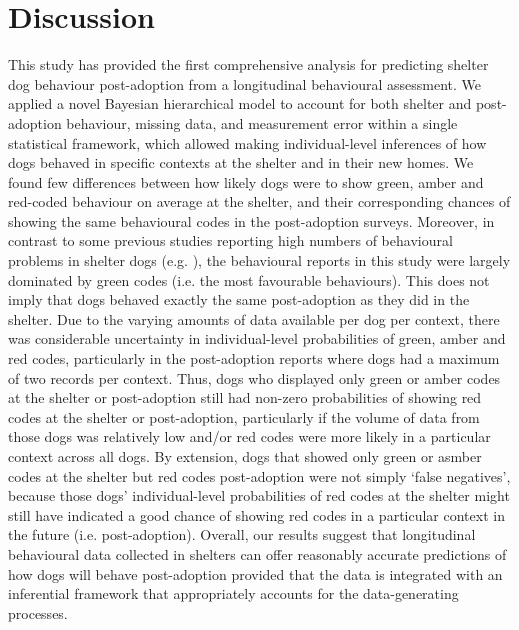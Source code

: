 \documentclass[12pt]{article}
\begin{document}
\section{Discussion}
This study has provided the first comprehensive analysis for predicting shelter dog behaviour post-adoption from a longitudinal behavioural assessment. We applied a novel Bayesian hierarchical model to account for both shelter and post-adoption behaviour, missing data, and measurement error within a single statistical framework, which allowed making individual-level inferences of how dogs behaved in specific contexts at the shelter and in their new homes. We found few differences between how likely dogs were to show green, amber and red-coded behaviour on average at the shelter, and their corresponding chances of showing the same behavioural codes in the post-adoption surveys. Moreover, in contrast to some previous studies reporting high numbers of behavioural problems in shelter dogs (e.g. \cite{gates2018}), the behavioural reports in this study were largely dominated by green codes (i.e. the most favourable behaviours). This does not imply that dogs behaved exactly the same post-adoption as they did in the shelter. Due to the varying amounts of data available per dog per context, there was considerable uncertainty in individual-level probabilities of green, amber and red codes, particularly in the post-adoption reports where dogs had a maximum of two records per context. Thus, dogs who displayed only green or amber codes at the shelter or post-adoption still had non-zero probabilities of showing red codes at the shelter or post-adoption, particularly if the volume of data from those dogs was relatively low and/or red codes were more likely in a particular context across all dogs. By extension, dogs that showed only green or asmber codes at the shelter but red codes post-adoption were not simply `false negatives', because those dogs' individual-level probabilities of red codes at the shelter might still have indicated a good chance of showing red codes in a particular context in the future (i.e. post-adoption). Overall, our results suggest that longitudinal behavioural data collected in shelters can offer reasonably accurate predictions of how dogs will behave post-adoption provided that the data is integrated with an inferential framework that appropriately accounts for the data-generating processes.
\end{document}

